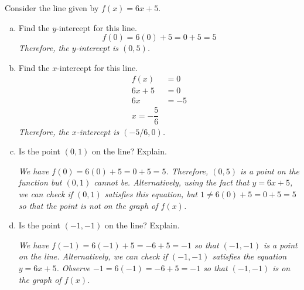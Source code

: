 \documentclass[11pt,letterpaper]{article}
\begin{document}
 Consider the line given by $f(x)= 6x + 5$.
\begin{enumerate}[(a)]
\item Find the $y$-intercept for this line. \pspace
	\[
	f(0)= 6(0) + 5= 0 + 5= 5
	\]
{\itshape Therefore, the $y$-intercept is $(0, 5)$.} \pvspace{2.5cm}

\item Find the $x$-intercept for this line. \pspace
	\[
	\begin{aligned}
	f(x)&= 0 \\
	6x + 5&= 0 \\
	6x&= -5 \\
	x= -\dfrac{5}{6}
	\end{aligned}
	\]
{\itshape Therefore, the $x$-intercept is $(-5/6, 0)$.} \pvspace{0.5cm}

\item Is the point $(0, 1)$ on the line? Explain. \pspace

{\itshape We have $f(0)= 6(0) + 5= 0 + 5= 5$. Therefore, $(0, 5)$ is a point on the function but $(0, 1)$ cannot be. Alternatively, using the fact that $y= 6x + 5$, we can check if $(0, 1)$ satisfies this equation, but $1 \neq 6(0) + 5= 0 + 5= 5$ so that the point is not on the graph of $f(x)$.} \pvspace{2.6cm}

\item Is the point $(-1, -1)$ on the line? Explain. \pspace

{\itshape We have $f(-1)= 6(-1) + 5= -6 + 5= -1$ so that $(-1, -1)$ is a point on the line. Alternatively, we can check if $(-1, -1)$ satisfies the equation $y= 6x + 5$. Observe $-1= 6(-1)= -6 + 5= -1$ so that $(-1, -1)$ is on the graph of $f(x)$.}
\end{enumerate}
\end{document}
